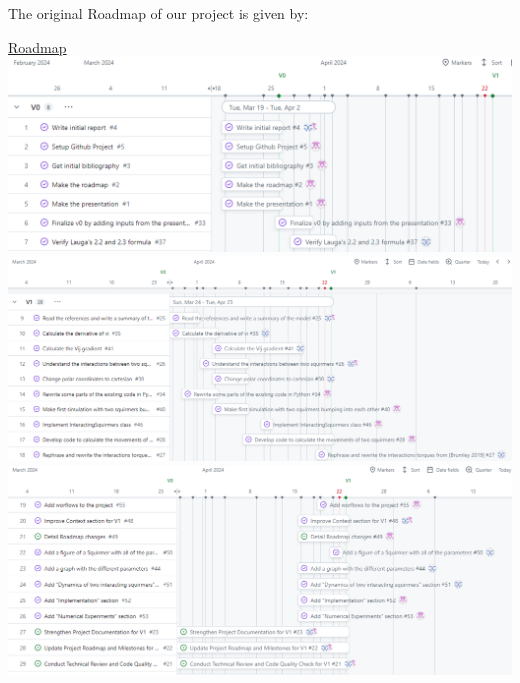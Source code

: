 \documentclass{article}
\begin{document}
The original Roadmap of our project is given by:
\begin{center}
    \href{https://github.com/orgs/master-csmi/projects/23/views/2}{Roadmap}
    \includegraphics[width=1.2\textwidth]{Presentation/V0/images/roadmapV0_1.png}
    \vspace{1em} %
    \includegraphics[width=1.2\textwidth]{Presentation/V0/images/roadmapV1_1.png}
    \vspace{1em} %
    \includegraphics[width=1.2\textwidth]{Presentation/V0/images/roadmapV1_2.png}
\end{center}


\newpage
\end{document}

